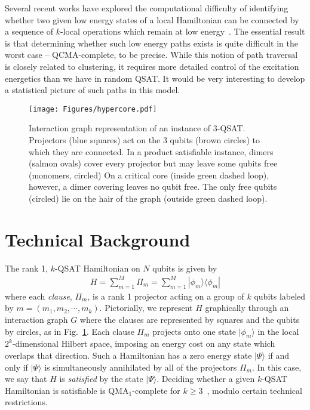 \documentclass[aps,pra,twocolumn,superscriptaddress,amsmath]{revtex4-1}
\newcommand{\ket}[1]{|#1\rangle}
\begin{document}
Several recent works have explored the computational difficulty of identifying whether two given low energy states of a local Hamiltonian can be connected by a sequence of $k$-local operations which remain at low energy~\cite{Gharibian2015, Gosset2016}. 
The essential result is that determining whether such low energy paths exists is quite difficult in the worst case -- QCMA-complete, to be precise. 
While this notion of path traversal is closely related to clustering, it requires more detailed control of the excitation energetics than we have in random QSAT. 
It would be very interesting to develop a statistical picture of such paths in this model.


\begin{figure}
 	\texttt{[image: Figures/hypercore.pdf]}
	\caption{\label{fig:interactionGraph} 
    Interaction graph representation of an instance of $3$-QSAT. 
    Projectors (blue squares) act on the 3 qubits (brown circles) to which they are connected.
    In a product satisfiable instance, dimers (salmon ovals) cover every projector but may leave some qubits free (monomers, circled)
    On a critical core (inside green dashed loop), however, a dimer covering leaves no qubit free. The only free qubits (circled) lie on the hair of the graph (outside green dashed loop).
    }
\end{figure}



\section{Technical Background}\label{sec:QSAT}

The rank 1, $k$-QSAT Hamiltonian on $N$ qubits is given by 
%
\begin{align}
H = \sum_{m=1}^{M} \Pi_m = \sum_{m=1}^{M} \left | \phi_m \rangle \langle \phi_m \right | 
\end{align}
%
where each \emph{clause}, $\Pi_m$, is a rank 1 projector acting on a group of $k$ qubits labeled by $m = (m_1, m_2, \cdots, m_k)$. 
Pictorially, we represent $H$ graphically through an interaction graph $G$ where the clauses are represented by squares and the qubits by circles, as in Fig.~\ref{fig:interactionGraph}.
Each clause $\Pi_m$ projects onto one state $\ket{\phi_m}$ in the local $2^k$-dimensional Hilbert space, imposing an energy cost on any state which overlaps that direction. 
Such a Hamiltonian has a zero energy state $\ket{\Psi}$ if and only if $\ket{\Psi}$ is simultaneously annihilated by all of the projectors $\Pi_m$. 
In this case, we say that $H$ is \emph{satisfied} by the state $\ket{\Psi}$. 
Deciding whether a given $k$-QSAT Hamiltonian is satisfiable is QMA$_1$-complete for $k \ge 3$~\cite{Bravyi2006, Gosset2013}, modulo certain technical restrictions. 
\end{document}
